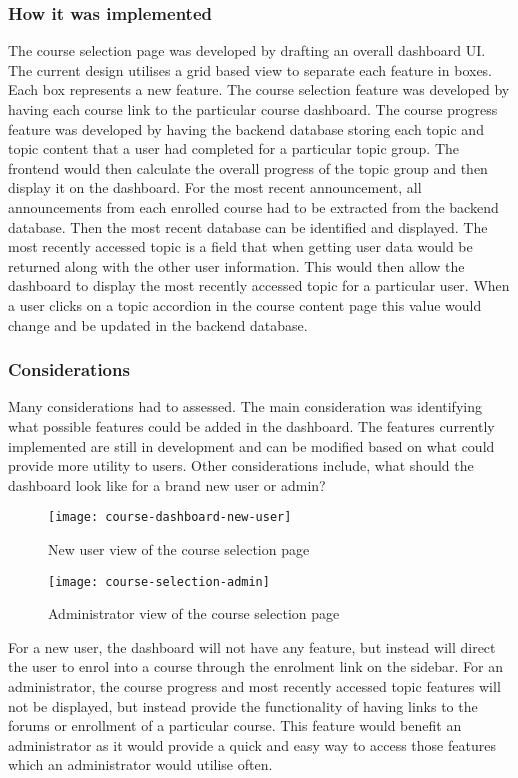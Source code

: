 \subsubsection{How it was implemented}
The course selection page was developed by drafting an overall dashboard UI. The current design utilises a grid based view to separate each feature in boxes.
Each box represents a new feature. The course selection feature was developed by having each course link to the particular course dashboard.
The course progress feature was developed by having the backend database storing each topic and topic content that a user had completed for a particular topic group.
The frontend would then calculate the overall progress of the topic group and then display it on the dashboard.
For the most recent announcement, all announcements from each enrolled course had to be extracted from the backend database. Then the most recent database can be identified and displayed.
The most recently accessed topic is a field that when getting user data would be returned along with the other user information.
This would then allow the dashboard to display the most recently accessed topic for a particular user. When a user clicks on a topic accordion in the course content page this value would change and be updated in the backend database.

\subsubsection{Considerations}
Many considerations had to assessed. The main consideration was identifying what possible features could be added in the dashboard.
The features currently implemented are still in development and can be modified based on what could provide more utility to users.
Other considerations include, what should the dashboard look like for a brand new user or admin?
\begin{figure}[h!]
    \centering
    \texttt{[image: course-dashboard-new-user]}
    \caption{New user view of the course selection page}
\end{figure}
\begin{figure}[h!]
    \centering
    \texttt{[image: course-selection-admin]}
    \caption{Administrator view of the course selection page}
\end{figure}
For a new user, the dashboard will not have any feature, but instead will direct the user to enrol into a course through the enrolment link on the sidebar.
For an administrator, the course progress and most recently accessed topic features will not be displayed, but instead provide the functionality of having links to the forums or enrollment of a particular course.
This feature would benefit an administrator as it would provide a quick and easy way to access those features which an administrator would utilise often.

